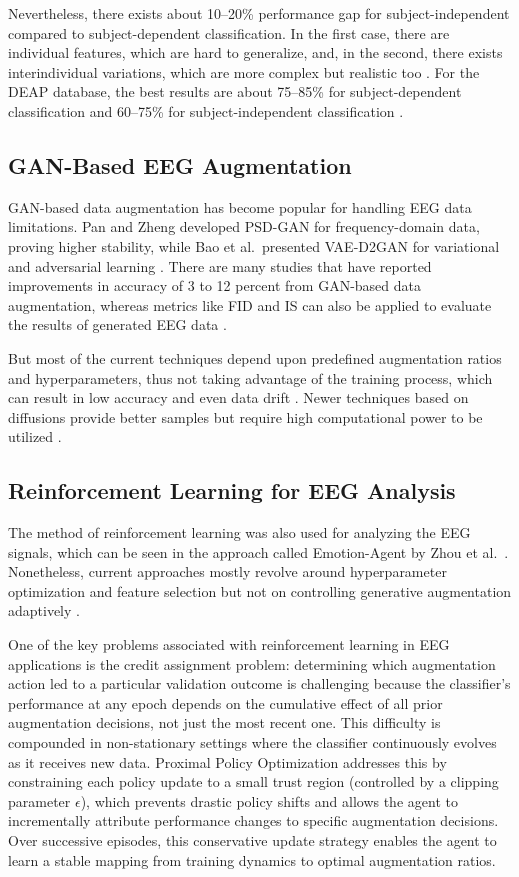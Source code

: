 \documentclass[conference]{IEEEtran}
\begin{document}
Nevertheless, there exists about 10--20\% performance gap for subject-independent compared to subject-dependent classification. In the first case, there are individual features, which are hard to generalize, and, in the second, there exists interindividual variations, which are more complex but realistic too \cite{hang2019domain}. For the DEAP database, the best results are about 75--85\% for subject-dependent classification and 60--75\% for subject-independent classification \cite{koelstra2012deap}.


\subsection{GAN-Based EEG Augmentation}
GAN-based data augmentation has become popular for handling EEG data limitations. Pan and Zheng developed PSD-GAN for frequency-domain data, proving higher stability, while Bao et al.\ presented VAE-D2GAN for variational and adversarial learning \cite{pan2021gan, bao2021gan}. There are many studies that have reported improvements in accuracy of 3 to 12 percent from GAN-based data augmentation, whereas metrics like FID and IS can also be applied to evaluate the results of generated EEG data \cite{habashi2023gan}.

But most of the current techniques depend upon predefined augmentation ratios and hyperparameters, thus not taking advantage of the training process, which can result in low accuracy and even data drift \cite{luo2020augmentation}. Newer techniques based on diffusions provide better samples but require high computational power to be utilized \cite{siddhad2024diffusion, zhao2024diffusion}.

\subsection{Reinforcement Learning for EEG Analysis}
The method of reinforcement learning was also used for analyzing the EEG signals, which can be seen in the approach called Emotion-Agent by Zhou et al.\ \cite{zhou2024emotion}. Nonetheless, current approaches mostly revolve around hyperparameter optimization and feature selection but not on controlling generative augmentation adaptively \cite{luo2020augmentation}.

One of the key problems associated with reinforcement learning in EEG applications is the credit assignment problem: determining which augmentation action led to a particular validation outcome is challenging because the classifier's performance at any epoch depends on the cumulative effect of all prior augmentation decisions, not just the most recent one. This difficulty is compounded in non-stationary settings where the classifier continuously evolves as it receives new data. Proximal Policy Optimization addresses this by constraining each policy update to a small trust region (controlled by a clipping parameter $\epsilon$), which prevents drastic policy shifts and allows the agent to incrementally attribute performance changes to specific augmentation decisions. Over successive episodes, this conservative update strategy enables the agent to learn a stable mapping from training dynamics to optimal augmentation ratios.
\end{document}
